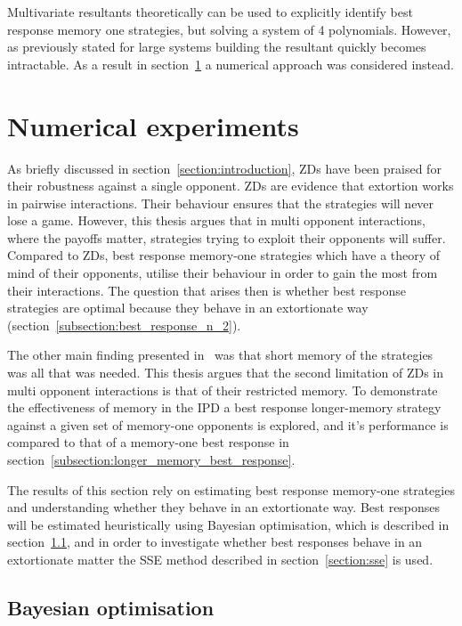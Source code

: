Multivariate resultants theoretically can be used to explicitly identify best
response memory one strategies, but solving a system of 4 polynomials. However,
as previously stated for large systems building the resultant quickly becomes
intractable. As a result in section~\ref{section:numerical_experiments}
a numerical approach was considered instead.

\section{Numerical experiments} \label{section:numerical_experiments}

As briefly discussed in section~\ref{section:introduction}, ZDs have been
praised for their robustness against a single opponent. ZDs are evidence that
extortion works in pairwise interactions. Their behaviour ensures that the
strategies will never lose a game. However, this thesis argues that in multi
opponent interactions, where the payoffs matter, strategies trying to exploit
their opponents will suffer. Compared to ZDs, best response memory-one
strategies which have a theory of mind of their opponents, utilise their
behaviour in order to gain the most from their interactions. The question that
arises then is whether best response strategies are optimal because they behave
in an extortionate way (section~\ref{subsection:best_response_n_2}).

The other main finding presented in~\cite{Press2012} was that short memory of
the strategies was all that was needed. This thesis argues that the second
limitation of ZDs in multi opponent interactions is that of their restricted
memory. To demonstrate the effectiveness of memory in the IPD a best response
longer-memory strategy against a given set of memory-one opponents is explored,
and it's performance is compared to that of a memory-one best response in
section~\ref{subsection:longer_memory_best_response}.

The results of this section rely on estimating best response memory-one
strategies and understanding whether they behave in an extortionate way. Best
responses will be estimated heuristically using Bayesian optimisation, which is
described in section~\ref{section:bayesian_optimisation}, and in order to
investigate whether best responses behave in an extortionate matter the SSE
method described in section~\ref{section:sse} is used.

\subsection{Bayesian optimisation}\label{section:bayesian_optimisation}

